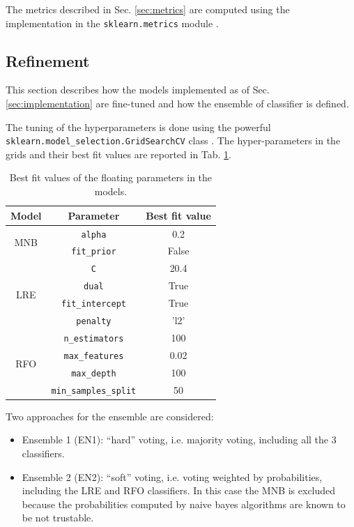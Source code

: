 \documentclass[a4paper,12pt]{article} %
\begin{document}
The metrics described in Sec. \ref{sec:metrics} are computed using the
implementation in the \texttt{sklearn.metrics} module \cite{scikit-metrics}.


\subsection{Refinement}
\label{sec:refinement}
This section describes how the models implemented as of Sec. \ref{sec:implementation} are
fine-tuned and how the ensemble of classifier is defined.

The tuning of the hyperparameters is done using the powerful\\
\texttt{sklearn.model\_selection.GridSearchCV} class \cite{scikit-gridsearchcv}.
The hyper-parameters in the grids and their best fit values are reported in Tab. \ref{tab:bestfit}.

\begin{table}
\begin{center}
\begin{tabular}{ c | c | c }
\textbf{Model} & \textbf{Parameter} & \textbf{Best fit value} \\ \hline
\multirow{2}{*}{MNB} & \texttt{alpha} & 0.2 \\
 & \texttt{fit\_prior} & False \\ \hline
\multirow{4}{*}{LRE} & \texttt{C} & 20.4 \\
 & \texttt{dual} & True\\
 & \texttt{fit\_intercept} & True\\
 & \texttt{penalty} & 'l2'\\ \hline
\multirow{4}{*}{RFO} & \texttt{n\_estimators} & 100 \\
 & \texttt{max\_features} & 0.02 \\
 & \texttt{max\_depth} & 100 \\
 & \texttt{min\_samples\_split} & 50 \\ \hline
\end{tabular}
\end{center}
\caption{Best fit values of the floating parameters in the models.
\label{tab:bestfit}}
\end{table}

Two approaches for the ensemble are considered:
\begin{itemize}
\item Ensemble 1 (EN1): ``hard'' voting, i.e. majority voting, including all the 3 classifiers.
\item Ensemble 2 (EN2): ``soft'' voting, i.e. voting weighted by probabilities, including the LRE and RFO classifiers.
In this case the MNB is excluded because the probabilities computed by naive bayes
algorithms are known to be not trustable.
\end{itemize}
\end{document}

